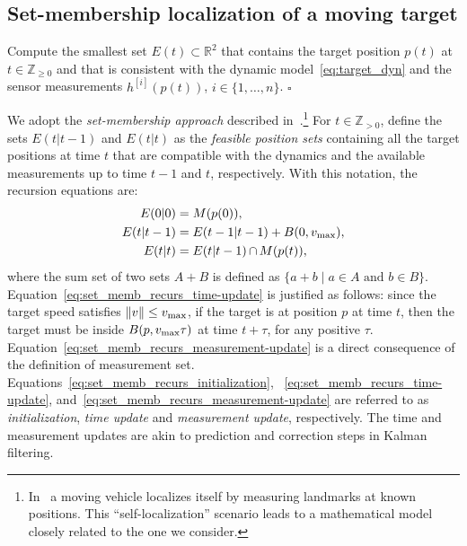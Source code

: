 \documentclass[onecolumn,journal,letterpaper]{IEEEtran}
\renewcommand{\natural}{{\mathbb{N}}}
\newcommand{\integernonnegative}{{\mathbb{Z}_{\geq0}}}
\renewcommand{\natural}{{\mathbb{Z}_{>0}}}
\newcommand{\real}{{\mathbb{R}}}
\newcommand{\subscr}[2]{{#1}_{\textup{#2}}}
\newcommand{\intersection}{\ensuremath{\operatorname{\cap}}}
\newcommand{\setdef}[2]{\{#1 \; | \; #2\}}
\newcommand{\norm}[1]{\|#1\|}
\newcommand{\cball}[2]{B(#2,#1)}
\newcommand{\until}[1]{\{1,\dots,#1\}}
\newcommand{\supind}[2]{{#1}^{[#2]}}
\newcommand\oprocendsymbol{\hbox{$\square$}}
\newcommand\oprocend{\relax\ifmmode\else\unskip\hfill\fi\oprocendsymbol}
\begin{document}
\subsection{Set-membership localization of a moving target}

\begin{problem}
  Compute the smallest set $E(t)\subset\real^2$ that contains the target
  position $p(t)$ at $t\in\integernonnegative$ and that is consistent with
  the dynamic model~\eqref{eq:target_dyn} and the sensor measurements
  $\supind{h}{i}(p(t))$, $i\in\until{n}$. \oprocend
\end{problem}


We adopt the \emph{set-membership approach} described
in~\cite{AG-AV:01}.\footnote{In~\cite{AG-AV:01} a moving vehicle localizes
  itself by measuring landmarks at known positions. This
  ``self-localization'' scenario leads to a mathematical model closely
  related to the one we consider.  }  For $t\in\natural$, define the sets
$E(t|t-1)$ and $E(t|t)$ as the \emph{feasible position sets} containing all
the target positions at time $t$ that are compatible with the dynamics and
the available measurements up to time $t-1$ and $t$, respectively.  With
this notation, the recursion equations are:
\begin{subequations}
  \label{eq:set_memb_recurs}
  \begin{align}
    E(0|0)    &= M(p(0)),
    \label{eq:set_memb_recurs_initialization} \\
    E(t|t-1)  &=  E(t-1|t-1) + \cball{\subscr{v}{max}}{0},
    \label{eq:set_memb_recurs_time-update}
    \\
    E(t|t) &= E(t|t-1) \intersection M(p(t)) ,
    \label{eq:set_memb_recurs_measurement-update}
  \end{align}
\end{subequations}
where the sum set of two sets $A+B$ is defined as $\setdef{a+b}{a\in A
  \text{ and }b\in B}$.  Equation~\eqref{eq:set_memb_recurs_time-update} is
justified as follows: since the target speed satisfies
$\norm{v}{}\leq\subscr{v}{max}$, if the target is at position $p$ at time
$t$, then the target must be inside $\cball{\subscr{v}{max}\tau}{p}$ at
time $t+\tau$, for any positive $\tau$.
Equation~\eqref{eq:set_memb_recurs_measurement-update} is a direct
consequence of the definition of measurement set.
Equations~\eqref{eq:set_memb_recurs_initialization},
~\eqref{eq:set_memb_recurs_time-update},
and~\eqref{eq:set_memb_recurs_measurement-update} are referred to as
\emph{initialization}, \emph{time update} and \emph{measurement update},
respectively. The time and measurement updates are akin to prediction and
correction steps in Kalman filtering.
\end{document}
